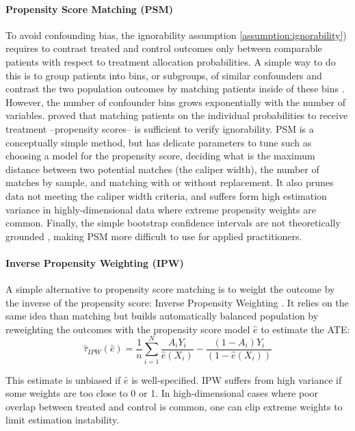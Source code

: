 \documentclass[french,12pt,twoside,a4paper]{book}
\begin{document}
\begin{appendices}
\begin{background_box_left}
    \paragraph{Propensity Score Matching (PSM)} To avoid confounding bias, the
    ignorability assumption \ref{assumption:ignorability}) requires to contrast
    treated and control outcomes only between comparable patients with respect to
    treatment allocation probabilities. A simple way to do this is to group
    patients into bins, or subgroups, of similar confounders and contrast the two
    population outcomes by matching patients inside of these bins
    \citep{stuart2010matching}. However, the number of confounder bins grows
    exponentially with the number of variables. \cite{rosenbaum_central_1983} proved
    that matching patients on the individual probabilities to receive treatment
    --propensity scores-- is sufficient to verify ignorability. PSM is a
    conceptually simple method, but has delicate parameters to tune such as
    choosing a model for the propensity score, deciding what is the maximum
    distance between two potential matches (the caliper width), the number of
    matches by sample, and matching with or without replacement. It also prunes data
    not meeting the caliper width criteria, and suffers form high estimation
    variance in highly-dimensional data where extreme propensity weights are common.
    Finally, the simple bootstrap confidence intervals are not theoretically
    grounded \citep{abadie2008failure}, making PSM more difficult
    to use for applied practitioners.


    \paragraph{Inverse Propensity Weighting (IPW)}

    A simple alternative to propensity score matching is to weight the outcome by
    the inverse of the propensity score: Inverse Propensity Weighting
    \citep{austin2015moving}. It relies on the same idea than matching but builds
    automatically balanced population by reweighting the outcomes with the
    propensity score model $\hat{e}$ to estimate the ATE:
    \begin{equation}
      \hat \tau_{IPW}(\hat e) = \frac{1}{n} \sum_{i=1}^N \frac{A_i Y_i}{\hat e(X_i)} - \frac{(1-A_i)Y_i}{(1-\hat e(X_i))}
    \end{equation}

    This estimate is unbiased if $\hat e$ is well-specified. IPW suffers from high
    variance if some weights are too close to 0 or 1. In high-dimensional cases
    where poor overlap between treated and control is common, one can clip extreme
    weights to limit estimation instability.


\end{background_box_left}
\end{appendices}
\end{document}
